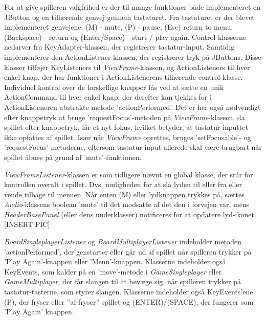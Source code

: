 For at give spilleren valgfrihed er der til mange funktioner både implementeret en JButton og en tilhørende genvej gennem tastaturet. Fra tastaturet er der blevet implementeret genvejene: (M) - mute, (P) - pause, (Esc) return to menu, (Backspace) - return og (Enter/Space) - start / play again. Control-klasserne nedarver fra KeyAdapter-klassen, der registrerer tastatur-input. Samtidig implementerer den ActionListener-klassen, der registrerer tryk på JButtons. Disse klasser tilføjer KeyListeners til \textit{ViewFrame}-klassen, og ActionListeners til hver enkel knap, der har funktioner i ActionListenerens tilhørende control-klasse. Individuel kontrol over de forskellige knapper fås ved at sætte en unik ActionCommand til hver enkel knap, der derefter kan tjekkes for i ActionListeneren abstrakte metode 'actionPerformed'. Det er her også nødvendigt efter knappetryk at bruge 'requestFocus'-metoden på \textit{ViewFrame}-klassen, da spillet efter knappetryk, får et nyt fokus, hvilket betyder, at tastatur-inputtet ikke opfattes af spillet.
Især når \textit{ViewFrame} oprettes, bruges 'setFocusable'- og 'requestFocus'-metoderne, eftersom tastatur-input allerede skal være brugbart når spillet åbnes på grund af 'mute'-funktionen.
\linebreak

\textit{ViewFrameListener}-klassen er som tidligere nævnt en global klasse, der står for kontrollen overalt i spillet. Dvs. muligheden for at slå lyden til eller fra eller vende tilbage til menuen. Når enten (M) eller lydknappen trykkes på, sættes \textit{Audio}-klassens boolean 'mute' til det modsatte af det den i forvejen var, mens \textit{HeaderBasePanel} (eller dens underklasser) notificeres for at opdatere lyd-ikonet. [INSERT PIC]
\linebreak

\textit{BoardSingleplayerListener} og \textit{BoardMultiplayerListener} indeholder metoden 'actionPerformed', der genstarter eller går ud af spillet når spilleren trykker på 'Play Again'-knappen eller 'Menu'-knappen. Klasserne indeholder også KeyEvents, som kalder på en 'move'-metode i \textit{GameSingleplayer} eller \textit{GameMultiplayer}, der får slangen til at bevæge sig, når spilleren trykker på tastatur-tasterne, som styrer slangen. Klasserne indeholder også KeyEvents'ene (P), der fryser eller ''af-fryser'' spillet og (ENTER)/(SPACE), der fungerer som 'Play Again' knappen.
\linebreak


